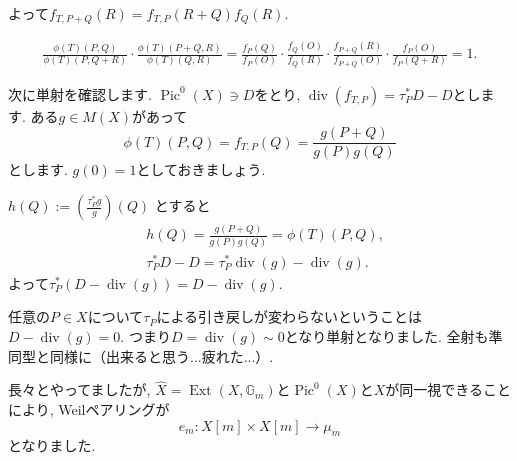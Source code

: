 \documentclass{jsarticle}
\newcommand{\GG}{\mathbb{G}}
\newcommand{\makeop}[1]{\mathop{\mathrm{#1}}\nolimits}
\def\Ext{\makeop{Ext}}
\def\Pic{\makeop{Pic}}
\def\div{\makeop{div}}
\theoremstyle{definition}
\numberwithin{theorem}{section}
\begin{document}
よって$f_{T, P+Q}(R) = f_{T, P}(R+Q) f_Q(R)$.

\begin{align*}
\frac{\phi(T)(P, Q) }{\phi(T)(P, Q+R)} \cdot \frac{\phi(T)(P+Q, R)}{\phi(T)(Q, R)}
= \frac{f_P(Q)}{f_P(O)} \cdot \frac{f_Q(O)}{f_Q(R)} \cdot \frac{f_{P+Q}(R)}{f_{P+Q}(O)} \cdot \frac{f_P(O)}{f_P(Q+R)}= 1.
\end{align*}

次に単射を確認します. $\Pic^0(X) \ni D$をとり, $\div(f_{T, P}) = \tau_P^*D - D$とします.
ある$g \in M(X)$があって
\[
\displaystyle\phi(T)(P, Q) = f_{T, P}(Q) = \frac{g(P+Q)}{g(P) g(Q)}
\]
とします. $g(0) = 1$としておきましょう.

$h(Q) := \left(\frac{\tau_P^*g}{g}\right)(Q)$ とすると
\begin{align*}
& h(Q) = \frac{g(P+Q)}{g(P)g(Q)} = \phi(T)(P, Q),\\
& \tau_P^*D - D =\tau_P^*\div(g) - \div(g).
\end{align*}
よって$\tau_P^*(D - \div(g)) = D - \div(g)$.

任意の$P \in X$について$\tau_P$による引き戻しが変わらないということは$D - \div(g) = 0$. つまり$D = \div(g) \sim 0$となり単射となりました. 全射も準同型と同様に（出来ると思う...疲れた...）.

長々とやってましたが, $\hat{X} = \Ext(X, \GG_m)$と$\Pic^0(X)$と$X$が同一視できることにより, Weilペアリングが
\begin{equation*}
e_m: X[m] \times X[m] \rightarrow \mu_m
\end{equation*}
となりました.
\end{document}
